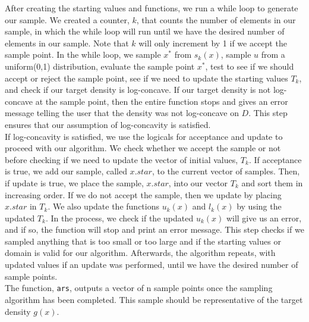 \documentclass[12pt]{article}
\begin{document}
After creating the starting values and functions, we run a while loop to generate our sample.  We created a counter, $k$, that counts the number of elements in our sample, in which the while loop will run until we have the desired number of elements in our sample. Note that $k$ will only increment by 1 if we accept the sample point.  In the while loop, we sample $x^*$ from $s_k(x)$, sample $u$ from a uniform(0,1) distribution, evaluate the sample point $x^*$, test to see if we should accept or reject the sample point, see if we need to update the starting values $T_k$, and check if our target density is log-concave.  If our target density is not log-concave at the sample point, then the entire function stops and gives an error message telling the user that the density was not log-concave on $D$.  This step ensures that our assumption of log-concavity is satisfied.\\

If log-concavity is satisfied, we use the logicals for acceptance and update to proceed with our algorithm.  We check whether we accept the sample or not before checking if we need to update the vector of initial values, $T_k$.  If acceptance is true, we add our sample, called $x.star$, to the current vector of samples. Then, if update is true, we place the sample, $x.star$, into our vector $T_k$ and sort them in increasing order. If we do not accept the sample, then we update by placing $x.star$ in $T_k$.  We also update the functions $u_k(x)$ and $l_k(x)$ by using the updated $T_k$.  In the process, we check if the updated $u_k(x)$ will give us an error, and if so, the function will stop and print an error message.  This step checks if we sampled anything that is too small or too large and if the starting values or domain is valid for our algorithm.  Afterwards, the algorithm repeats, with updated values if an update was performed, until we have the desired number of sample points.\\

The function, \texttt{ars}, outputs a vector of n sample points once the sampling algorithm has been completed.  This sample should be representative of the target density $g(x)$.  
\end{document}
